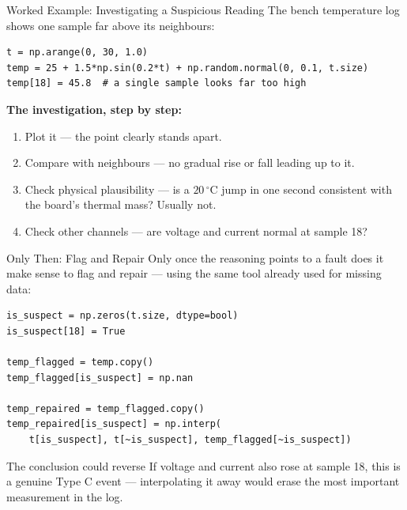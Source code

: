 \documentclass[9pt,aspectratio=169,xcolor=table]{beamer}
\begin{document}
\begin{frame}[fragile]{Worked Example: Investigating a Suspicious Reading}
    \leavevmode
    The bench temperature log shows one sample far above its
    neighbours:

\begin{lstlisting}
t = np.arange(0, 30, 1.0)
temp = 25 + 1.5*np.sin(0.2*t) + np.random.normal(0, 0.1, t.size)
temp[18] = 45.8  # a single sample looks far too high
\end{lstlisting}

    \vspace{1mm}
    \textbf{The investigation, step by step:}
    \begin{enumerate}\small
        \item \alert{Plot it} --- the point clearly stands apart.
        \item \alert{Compare with neighbours} --- no gradual rise or
              fall leading up to it.
        \item \alert{Check physical plausibility} --- is a
              $20\,^{\circ}\text{C}$ jump in one second consistent
              with the board's thermal mass? Usually not.
        \item \alert{Check other channels} --- are voltage and current
              normal at sample 18?
    \end{enumerate}
\end{frame}

\begin{frame}[fragile]{Only Then: Flag and Repair}
    \leavevmode
    Only once the reasoning points to a fault does it make sense to
    flag and repair --- using the same tool already used for missing
    data:

\begin{lstlisting}
is_suspect = np.zeros(t.size, dtype=bool)
is_suspect[18] = True

temp_flagged = temp.copy()
temp_flagged[is_suspect] = np.nan

temp_repaired = temp_flagged.copy()
temp_repaired[is_suspect] = np.interp(
    t[is_suspect], t[~is_suspect], temp_flagged[~is_suspect])
\end{lstlisting}

    \vspace{2mm}
    \begin{alertblock}{The conclusion could reverse}
        If voltage and current also rose at sample 18, this is a
        genuine Type C event --- interpolating it away would erase the
        most important measurement in the log.
    \end{alertblock}
\end{frame}
\end{document}
